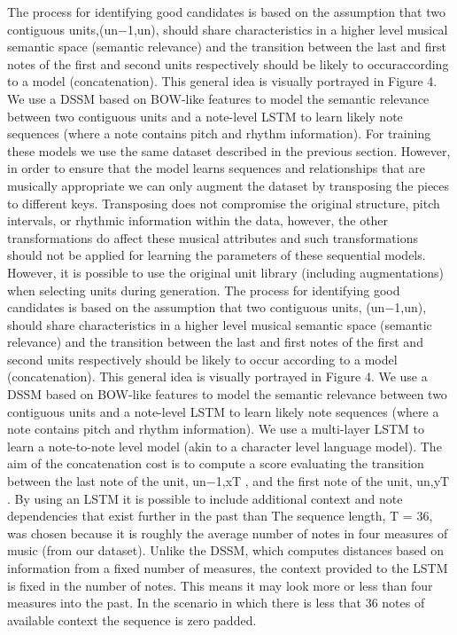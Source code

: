 The process for identifying good candidates is based on the assumption that two contiguous units,(un−1,un), should share characteristics in a higher level musical semantic space (semantic relevance) and the transition between the last and first notes of the first and second units respectively should be likely to occuraccording to a model (concatenation). This general idea is visually portrayed in Figure 4. We use a DSSM based on BOW-like features to model the semantic relevance between two contiguous units and a note-level LSTM to learn likely note sequences (where a note contains pitch and rhythm information). For training these models we use the same dataset described in the previous section. However, in order to ensure that the model learns sequences and relationships that are musically appropriate we can only augment the dataset by transposing the pieces to different keys. Transposing does not compromise the original structure, pitch intervals, or rhythmic information within the data, however, the other transformations do affect these musical attributes and such transformations should not be applied for learning the parameters of these sequential models. However, it is possible to use the original unit library (including augmentations) when selecting units during generation.
The process for identifying good candidates is based on the assumption that two contiguous units, (un−1,un), should share characteristics in a higher level musical semantic space (semantic relevance) and the transition between the last and first notes of the first and second units respectively should be likely to occur according to a model (concatenation). This general idea is visually portrayed in Figure 4. We use a DSSM based on BOW-like features to model the semantic relevance  between two contiguous units and a note-level LSTM to learn likely note sequences (where a note contains pitch and rhythm information).
We use a multi-layer LSTM to learn a note-to-note level model (akin to a character level language model). The aim of the concatenation cost is to compute a score evaluating the transition between the last note of the unit, un−1,xT , and the first note of the unit, un,yT . By using an LSTM it is possible to include additional context and note dependencies that exist further in the past than The sequence length, T = 36, was chosen because it is roughly the average number of notes in four measures of music (from our dataset). Unlike the DSSM, which computes distances based on information from a fixed number of measures, the context provided to the LSTM is fixed in the number of notes. This means it may look more or less than four measures into the past. In the scenario in which there is less that 36 notes of available context the sequence is zero padded.
